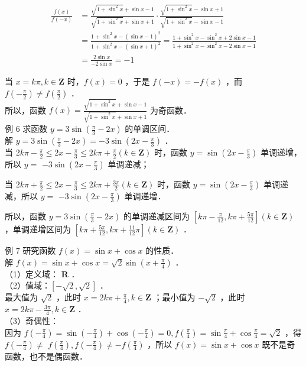\documentclass[10pt]{article}
\begin{document}
\[
\begin{aligned}
\frac{f(x)}{f(-x)} & =\frac{\sqrt{1+\sin ^{2} x}+\sin x-1}{\sqrt{1+\sin ^{2} x}+\sin x+1} \cdot \frac{\sqrt{1+\sin ^{2} x}-\sin x+1}{\sqrt{1+\sin ^{2} x}-\sin x-1} \\
& =\frac{1+\sin ^{2} x-(\sin x-1)^{2}}{1+\sin ^{2} x-(\sin x+1)^{2}}=\frac{1+\sin ^{2} x-\sin ^{2} x+2 \sin x-1}{1+\sin ^{2} x-\sin ^{2} x-2 \sin x-1} \\
& =\frac{2 \sin x}{-2 \sin x}=-1
\end{aligned}
\]

当 \(x=k \pi, k \in \mathbf{Z}\) 时，\(f(x)=0\) ，于是 \(f(-x)=-f(x)\) ，而 \(f\left(-\frac{\pi}{2}\right) \neq f\left(\frac{\pi}{2}\right)\) ．\\
所以，函数 \(f(x)=\frac{\sqrt{1+\sin ^{2} x}+\sin x-1}{\sqrt{1+\sin ^{2} x}+\sin x+1}\) 为奇函数．\\
例 6 求函数 \(y=3 \sin \left(\frac{\pi}{3}-2 x\right)\) 的单调区间．\\
解 \(y=3 \sin \left(\frac{\pi}{3}-2 x\right)=-3 \sin \left(2 x-\frac{\pi}{3}\right)\) ．\\
当 \(2 k \pi-\frac{\pi}{2} \leqslant 2 x-\frac{\pi}{3} \leqslant 2 k \pi+\frac{\pi}{2}(k \in \mathbf{Z})\) 时，函数 \(y=\sin \left(2 x-\frac{\pi}{3}\right)\) 单调递增，所以 \(y=\) \(-3 \sin \left(2 x-\frac{\pi}{3}\right)\) 单调递减；

当 \(2 k \pi+\frac{\pi}{2} \leqslant 2 x-\frac{\pi}{3} \leqslant 2 k \pi+\frac{3 \pi}{2}(k \in \mathbf{Z})\) 时，函数 \(y=\sin \left(2 x-\frac{\pi}{3}\right)\) 单调递减，所以 \(y=\) \(-3 \sin \left(2 x-\frac{\pi}{3}\right)\) 单调递增．

所以，函数 \(y=3 \sin \left(\frac{\pi}{3}-2 x\right)\) 的单调递减区间为 \(\left[k \pi-\frac{\pi}{12}, k \pi+\frac{5 \pi}{12}\right](k \in \mathbf{Z})\) ，单调递增区间为 \(\left[k \pi+\frac{5 \pi}{12}, k \pi+\frac{11}{12} \pi\right](k \in \mathbf{Z})\) ．

例 7 研究函数 \(f(x)=\sin x+\cos x\) 的性质．\\
解 \(f(x)=\sin x+\cos x=\sqrt{2} \sin \left(x+\frac{\pi}{4}\right)\) ．\\
（1）定义域： \(\mathbf{R}\) ．\\
（2）值域：\([-\sqrt{2}, \sqrt{2}]\) ．\\
最大值为 \(\sqrt{2}\) ，此时 \(x=2 k \pi+\frac{\pi}{4}, k \in \mathbf{Z}\) ；最小值为 \(-\sqrt{2}\) ，此时 \(x=2 k \pi-\frac{3 \pi}{4}, k \in \mathbf{Z}\) ．\\
（3）奇偶性：\\
因为 \(f\left(-\frac{\pi}{4}\right)=\sin \left(-\frac{\pi}{4}\right)+\cos \left(-\frac{\pi}{4}\right)=0, f\left(\frac{\pi}{4}\right)=\sin \frac{\pi}{4}+\cos \frac{\pi}{4}=\sqrt{2}\) ，得 \(f\left(-\frac{\pi}{4}\right) \neq\) \(f\left(\frac{\pi}{4}\right), f\left(-\frac{\pi}{4}\right) \neq-f\left(\frac{\pi}{4}\right)\) ，所以 \(f(x)=\sin x+\cos x\) 既不是奇函数，也不是偶函数．
\end{document}
